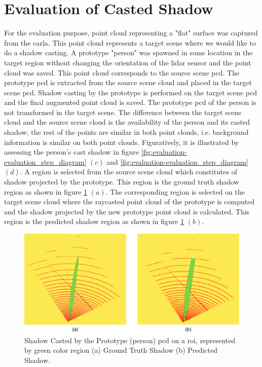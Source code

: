 \section{Evaluation of Casted Shadow}
For the evaluation purpose, point cloud representing a "flat" surface was captured from the \acrshort{carla}. This point cloud represents a target scene where we would like to do a shadow casting. A prototype "person" was spawned in some location in the target region without changing the orientation of the lidar sensor and the point cloud was saved. This point cloud corresponds to the source scene \acrshort{pcd}. The prototype \acrshort{pcd} is extracted from the source scene cloud and placed in the target scene \acrshort{pcd}. Shadow casting by the prototype is performed on the target scene \acrshort{pcd} and the final augmented point cloud is saved. The prototype \acrshort{pcd} of the person is not transformed in the target scene. The difference between the target scene cloud and the source scene cloud is the availability of the person and its casted shadow, the rest of the points are similar in both point clouds, i.e. background information is similar on both point clouds. 
Figuratively, it is illustrated by assessing the person's cast shadow in figure \ref{fig:evaluation-evaluation_step_diagram} \((c)\) and \ref{fig:evaluation-evaluation_step_diagram} \((d)\).
A region is selected from the source scene cloud which constitutes of shadow projected by the prototype. This region is the ground truth shadow region as shown in figure \ref{fig:evaluation-shadow_difference_roi} \((a)\). The corresponding region is selected on the target scene cloud where the raycasted point cloud of the prototype is computed and the shadow projected by the new prototype point cloud is calculated. This region is the predicted shadow region as shown in figure \ref{fig:evaluation-shadow_difference_roi} \((b)\).
\begin{figure}[htbp]
    \centering
    \includegraphics[width=1\linewidth]{97_graphics//evaluation/shadow_difference_roi.pdf}
    \caption[Shadow Casted by the Prototype.]{Shadow Casted by the Prototype (person) \acrshort{pcd} on a \acrshort{roi}, represented by green color region (a) Ground Truth Shadow (b) Predicted Shadow.}
    \label{fig:evaluation-shadow_difference_roi}
\end{figure}

